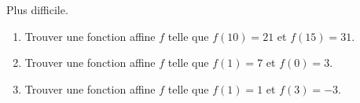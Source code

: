 
\begin{exercice}\label{exosmath-0503}

    Plus difficile.
    \begin{enumerate}
        \item
            Trouver une fonction affine \( f\) telle que \( f(10)=21\) et \( f(15)=31\).
        \item
            Trouver une fonction affine \( f\) telle que \( f(1)=7\) et \( f(0)=3\).
        \item
            Trouver une fonction affine \( f\) telle que \( f(1)=1\) et \( f(3)=-3\).
    \end{enumerate}

\end{exercice}
